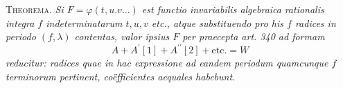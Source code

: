 \textsc{Theorema.} \textit{Si \(F=\varphi(t,\allowbreak u.v\ldots)\) est functio invariabilis algebraica} \textit{rationalis integra \(f\) indeterminatarum \(t,\allowbreak u,\allowbreak v\) etc., atque substituendo pro his \(f\) radices in periodo \((f,\allowbreak \lambda)\) contentas, valor ipsius \(F\) per praecepta art. 340 ad formam} \[A+A^{\prime}[1]+A^{\prime\prime}[2]+\text{etc.}=W\] \textit{reducitur: radices quae in hac expressione ad eandem periodum quamcunque \(f\) terminorum pertinent, coëfficientes aequales habebunt.}

